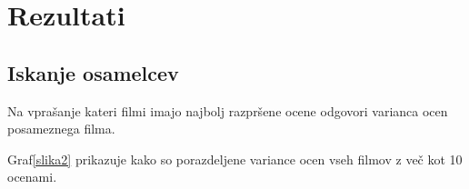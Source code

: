 \documentclass[a4paper,11pt]{article}
\begin{document}
\section{Rezultati}




\subsection{Iskanje osamelcev}
Na vprašanje kateri filmi imajo najbolj razpršene ocene odgovori varianca ocen posameznega filma. 

Graf\ref{slika2} prikazuje kako so porazdeljene variance ocen vseh filmov z več kot 10 ocenami.
\end{document}
